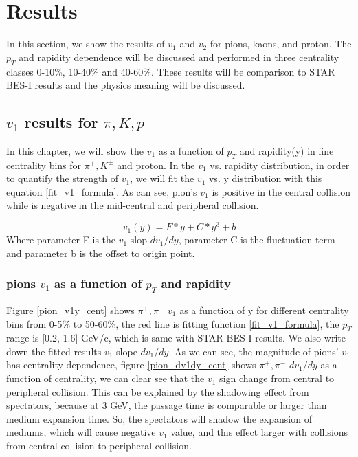 \section{Results} 
In this section, we show the results of $v_{1}$ and $v_{2}$ for pions, kaons, and proton. The $p_{T}$ and rapidity dependence will be discussed and performed in three centrality classes 0-10\%, 10-40\% and 40-60\%. These results will be comparison to STAR BES-I results and the physics meaning will be discussed.

\subsection{$v_{1}$ results for $\pi, K, p$}
In this chapter, we will show the $v_{1}$ as a function of $p_{T}$ and rapidity(y) in fine centrality bins for $\pi^{\pm}, K^{\pm}$ and proton. In the $v_{1}$  vs. rapidity distribution, in order to quantify the strength of  $v_{1}$, we will fit the $v_{1}$ vs. y distribution with this equation \ref{fit_v1_formula}. As can see, pion's $v_{1}$ is positive in the central collision while is negative in the mid-central and peripheral collision.

\begin{equation} \label{fit_v1_formula}
	v_{1}(y) = F*y + C*y^{3} +b 
\end{equation}
Where parameter F is the $v_{1}$ slop $dv_{1}/dy$, parameter C is the fluctuation term and parameter b is the offset to origin point.

\subsubsection{pions $v_{1}$ as a function of $p_{T}$ and rapidity}
Figure \ref{pion_v1y_cent} shows $\pi^{+}, \pi^{-}$ $v_{1}$ as a function of y for different centrality bins from 0-5\% to 50-60\%,  the red line is fitting function \ref{fit_v1_formula}, the $p_{T}$ range is [0.2, 1.6] GeV/c, which is same with STAR BES-I results. We also write down the fitted results $v_{1}$ slope $dv_{1}/dy$. As we can see, the magnitude of pions' $v_{1}$ has centrality dependence, figure \ref{pion_dv1dy_cent} shows $\pi^{+}, \pi^{-}$ $dv_{1}/dy$ as a function of centrality, we can clear see that the $v_{1}$ sign change from central to peripheral collision. This can be explained by the shadowing effect from spectators, because at 3 GeV, the passage time is comparable or larger than medium expansion time. So, the spectators will shadow the expansion of mediums, which will cause negative $v_{1}$ value, and this effect larger with collisions from central collision to peripheral collision.

